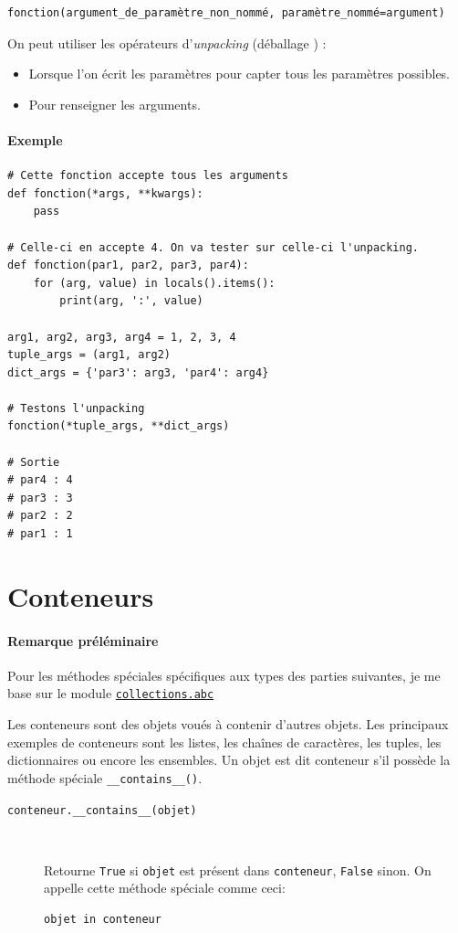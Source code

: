 \documentclass[a4paper, 10pt]{article}
\begin{document}
\begin{verbatim}
fonction(argument_de_paramètre_non_nommé, paramètre_nommé=argument)
\end{verbatim}

On peut utiliser les opérateurs d'\emph{unpacking} (\og déballage \fg{}) :
\begin{itemize}
    \item Lorsque l'on écrit les paramètres pour capter tous les paramètres possibles.
    \item Pour renseigner les arguments.
\end{itemize}

\paragraph{Exemple}
\begin{verbatim}
# Cette fonction accepte tous les arguments
def fonction(*args, **kwargs):
    pass

# Celle-ci en accepte 4. On va tester sur celle-ci l'unpacking.
def fonction(par1, par2, par3, par4):
    for (arg, value) in locals().items():
        print(arg, ':', value)

arg1, arg2, arg3, arg4 = 1, 2, 3, 4
tuple_args = (arg1, arg2)
dict_args = {'par3': arg3, 'par4': arg4}

# Testons l'unpacking
fonction(*tuple_args, **dict_args)

# Sortie
# par4 : 4
# par3 : 3
# par2 : 2
# par1 : 1
\end{verbatim}

\section{Conteneurs}

\paragraph{Remarque préléminaire} Pour les méthodes spéciales spécifiques aux types des parties suivantes, je me base sur le module \hyperref[abc]{\texttt{collections.abc}}\bigskip


Les conteneurs sont des objets voués à contenir d'autres objets. Les principaux exemples de conteneurs sont les listes, les chaînes de caractères, les tuples, les dictionnaires ou encore les ensembles. Un objet est dit conteneur s'il possède la méthode spéciale \texttt{__contains__()}.

\begin{description}
    \item[\texttt{conteneur.__contains__(objet)}]~

    Retourne \texttt{True} si \texttt{objet} est présent dans \texttt{conteneur}, \texttt{False} sinon. On appelle cette méthode spéciale comme ceci:
    \begin{verbatim}
objet in conteneur
    \end{verbatim}
\end{description}
\end{document}
